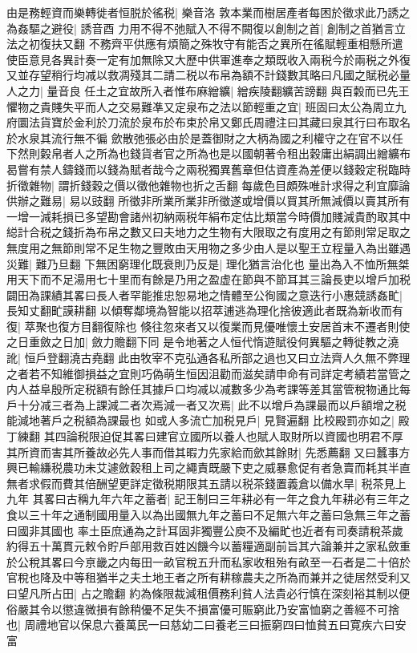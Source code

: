 由是務輕資而樂轉徙者恒脱於徭税|{
	樂音洛}
敦本業而樹居產者每困於徵求此乃誘之為姦驅之避役|{
	誘音酉}
力用不得不弛賦入不得不闕復以創制之首|{
	創制之首猶言立法之初復扶又翻}
不務齊平供應有煩簡之殊牧守有能否之異所在徭賦輕重相懸所遣使臣意見各異計奏一定有加無除又大歷中供軍進奉之類既收入兩税今於兩税之外復又並存望稍行均减以救凋殘其二請二税以布帛為額不計錢數其略曰凡國之賦税必量人之力|{
	量音良}
任土之宜故所入者惟布麻繒纊|{
	繒疾陵翻纊苦謗翻}
與百糓而已先王懼物之貴賤失平而人之交易難凖又定泉布之法以節輕重之宜|{
	班固曰太公為周立九府圜法貨寶於金利於刀流於泉布於布束於帛又鄭氏周禮注曰其藏曰泉其行曰布取名於水泉其流行無不徧}
歛散弛張必由於是蓋御財之大柄為國之利權守之在官不以任下然則糓帛者人之所為也錢貨者官之所為也是以國朝著令租出穀庸出絹調出繒纊布曷嘗有禁人鑄錢而以錢為賦者哉今之兩税獨異舊章但估資產為差便以錢穀定税臨時折徵雜物|{
	謂折錢穀之價以徵他雜物也折之舌翻}
每歲色目頗殊唯計求得之利宜靡論供辦之難易|{
	易以豉翻}
所徵非所業所業非所徵遂或增價以買其所無減價以賣其所有一增一減耗損已多望勘會諸州初納兩税年絹布定估比類當今時價加賤減貴酌取其中縂計合税之錢折為布帛之數又曰夫地力之生物有大限取之有度用之有節則常足取之無度用之無節則常不足生物之豐敗由天用物之多少由人是以聖王立程量入為出雖遇災難|{
	難乃旦翻}
下無困窮理化既衰則乃反是|{
	理化猶言治化也}
量出為入不恤所無桀用天下而不足湯用七十里而有餘是乃用之盈虚在節與不節耳其三論長吏以增戶加税闢田為課績其畧曰長人者罕能推忠恕易地之情體至公徇國之意迭行小惠競誘姦甿|{
	長知丈翻甿謨耕翻}
以傾奪鄰境為智能以招萃逋逃為理化捨彼適此者既為新收而有復|{
	萃聚也復方目翻復除也}
倏往忽來者又以復業而見優唯懷土安居首末不遷者則使之日重斂之日加|{
	斂力贍翻下同}
是令地著之人恒代惰遊賦役何異驅之轉徙教之澆訛|{
	恒戶登翻澆古堯翻}
此由牧宰不克弘通各私所部之過也又曰立法齊人久無不弊理之者若不知維御損益之宜則巧偽萌生恒因沮勸而滋矣請申命有司詳定考績若當管之内人益阜殷所定税額有餘任其據戶口均减以减數多少為考課等差其當管稅物通比每戶十分减三者為上課減二者次焉減一者又次焉|{
	此不以增戶為課最而以戶額增之税能減地著戶之税額為課最也}
如或人多流亡加税見戶|{
	見賢遍翻}
比校殿罰亦如之|{
	殿丁練翻}
其四論税限迫促其畧曰建官立國所以養人也賦人取財所以資國也明君不厚其所資而害其所養故必先人事而借其暇力先家給而歛其餘財|{
	先悉薦翻}
又曰蠶事方興已輸縑税農功未艾遽斂穀租上司之繩責既嚴下吏之威暴愈促有者急賣而耗其半直無者求假而費其倍酬望更詳定徵税期限其五請以税茶錢置義倉以備水旱|{
	税茶見上九年}
其畧曰古稱九年六年之蓄者|{
	記王制曰三年耕必有一年之食九年耕必有三年之食以三十年之通制國用量入以為出國無九年之蓄曰不足無六年之蓄曰急無三年之蓄曰國非其國也}
率土臣庶通為之計耳固非獨豐公庾不及編甿也近者有司奏請稅茶歲約得五十萬貫元敕令貯戶部用救百姓凶饑今以蓄糧適副前旨其六論兼并之家私斂重於公稅其畧曰今亰畿之内每田一畝官稅五升而私家收租殆有畝至一石者是二十倍於官稅也降及中等租猶半之夫土地王者之所有耕稼農夫之所為而兼并之徒居然受利又曰望凡所占田|{
	占之贍翻}
約為條限裁減租價務利貧人法貴必行慎在深刻裕其制以便俗嚴其令以懲違微損有餘稍優不足失不損富優可賑窮此乃安富恤窮之善經不可捨也|{
	周禮地官以保息六養萬民一曰慈幼二曰養老三曰振窮四曰恤貧五曰寛疾六曰安富}


